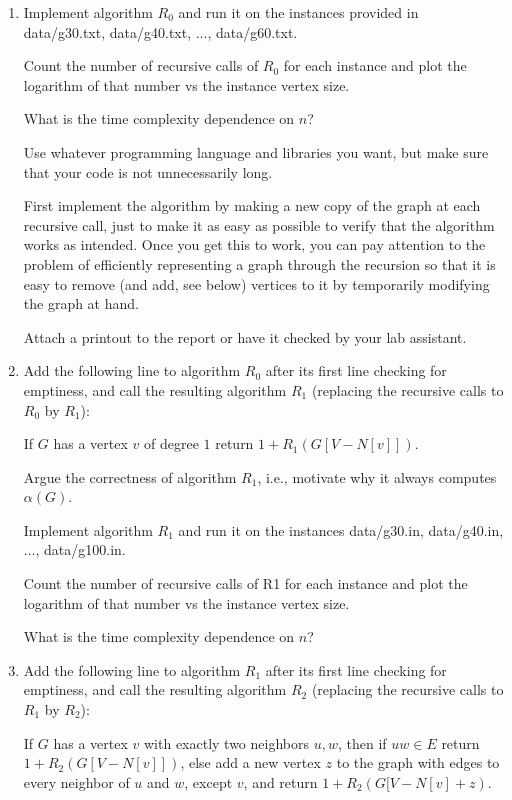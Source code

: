 \documentclass{tufte-handout}
\begin{document}
\begin{enumerate}
\item Implement algorithm $R_0$ and run it on the instances provided in
  data/g30.txt, data/g40.txt, ..., data/g60.txt.
  
  Count the number of recursive calls of $R_0$ for each instance and plot the
  logarithm of that number vs the instance vertex size. 
  
  What is the time complexity dependence on $n$?
  
  Use whatever programming language and libraries you want, but make
  sure that your code is not unnecessarily long.

  First implement the algorithm by making a new copy of the graph at
  each recursive call, just to make it as easy as possible to verify
  that the algorithm works as intended. Once you get this to work, you
  can pay attention to the problem of efficiently representing a graph
  through the recursion so that it is easy to remove (and add, see
  below) vertices to it by temporarily modifying the graph at hand.
   
  Attach a printout to the report or have it checked by your lab
  assistant.
\item Add the following line to algorithm $R_0$ after its first line
  checking for emptiness, and call the resulting algorithm $R_1$
  (replacing the recursive calls to $R_0$ by $R_1$):
 
 If $G$ has a vertex $v$ of degree $1$ return $1+R_1(G[V-N[v]])$.
 
 Argue the correctness of algorithm $R_1$, i.e., motivate why it always computes $\alpha(G)$.
 
 Implement algorithm $R_1$ and run it on the instances data/g30.in,
 data/g40.in, $\ldots$, data/g100.in.

  Count the number of recursive calls of R1 for each instance and plot the
  logarithm of that number vs the instance vertex size. 
  
  What is the time complexity dependence on $n$?

\item Add the following line to algorithm $R_1$ after its first line
  checking for emptiness, and call the resulting algorithm $R_2$
  (replacing the recursive calls to $R_1$ by $R_2$):
 
  If $G$ has a vertex $v$ with exactly two neighbors $u,w$, then if
  $uw\in E$ return $1+R_2(G[V-N[v]])$, else add a new vertex $z$ to
  the graph with edges to every neighbor of $u$ and $w$, except $v$,
  and return $1+R_2(G[V-N[v]+z)$.


\end{enumerate}
\end{document}
